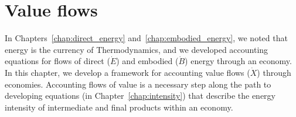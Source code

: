 %
%
%

\chapter{Value flows}
\label{chap:value} %








In Chapters~\ref{chap:direct_energy} and~\ref{chap:embodied_energy}, 
we noted that energy is the currency of Thermodynamics,
and we developed accounting equations for flows of 
direct ($\dot{E}$) and embodied ($\dot{B}$) energy through an economy.
In this chapter, we develop a framework for accounting
value flows ($\dot{X}$) through economies.
Accounting flows of value is a necessary step along
the path to developing equations (in Chapter~\ref{chap:intensity}) 
that describe the energy intensity of intermediate
and final products within an economy.



